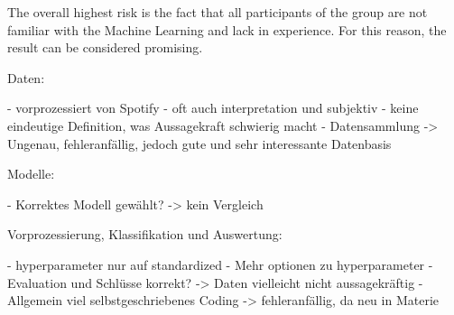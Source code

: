 The overall highest risk is the fact that all participants of the group are not familiar with the Machine Learning and lack in 
experience. For this reason, the result can be considered promising. 


Daten:

- vorprozessiert von Spotify
- oft auch interpretation und subjektiv
- keine eindeutige Definition, was Aussagekraft schwierig macht
- Datensammlung -> Ungenau, fehleranfällig, jedoch gute und sehr interessante Datenbasis

Modelle:

- Korrektes Modell gewählt? -> kein Vergleich 

Vorprozessierung, Klassifikation und Auswertung: 

- hyperparameter nur auf standardized 
- Mehr optionen zu hyperparameter
- Evaluation und Schlüsse korrekt? -> Daten vielleicht nicht aussagekräftig
- Allgemein viel selbstgeschriebenes Coding -> fehleranfällig, da neu in Materie 

